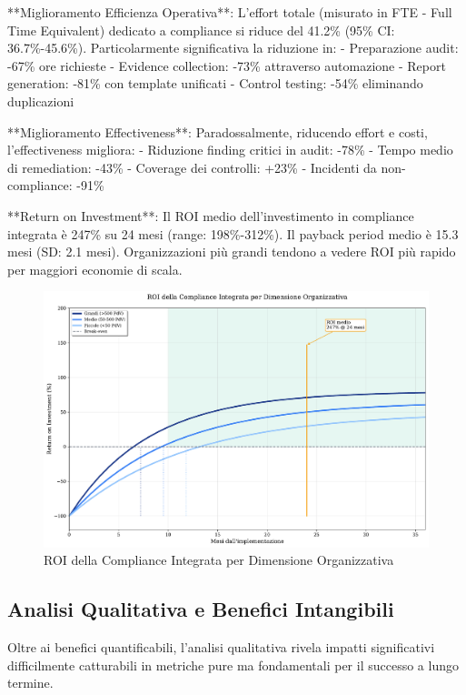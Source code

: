 **Miglioramento Efficienza Operativa**: L'effort totale (misurato in FTE - Full Time Equivalent) dedicato a compliance si riduce del 41.2\% (95\% CI: 36.7\%-45.6\%). Particolarmente significativa la riduzione in:
- Preparazione audit: -67\% ore richieste
- Evidence collection: -73\% attraverso automazione
- Report generation: -81\% con template unificati
- Control testing: -54\% eliminando duplicazioni

**Miglioramento Effectiveness**: Paradossalmente, riducendo effort e costi, l'effectiveness migliora:
- Riduzione finding critici in audit: -78\%
- Tempo medio di remediation: -43\%
- Coverage dei controlli: +23\%
- Incidenti da non-compliance: -91\%

**Return on Investment**: Il ROI medio dell'investimento in compliance integrata è 247\% su 24 mesi (range: 198\%-312\%). Il payback period medio è 15.3 mesi (SD: 2.1 mesi). Organizzazioni più grandi tendono a vedere ROI più rapido per maggiori economie di scala.

\begin{figure}[htbp]
\centering
\includegraphics[width=\textwidth]{thesis_figures/cap4/figura_4_2_roi_compliance.pdf}
\caption{ROI della Compliance Integrata per Dimensione Organizzativa}
\label{fig:roi_compliance}
\end{figure}

\subsection{Analisi Qualitativa e Benefici Intangibili}

Oltre ai benefici quantificabili, l'analisi qualitativa rivela impatti significativi difficilmente catturabili in metriche pure ma fondamentali per il successo a lungo termine.

